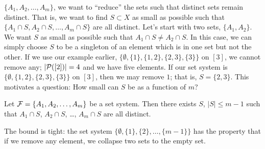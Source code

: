  $\{A_1,A_2,\dotsc,A_m\}$, we want to ``reduce'' the sets such that distinct sets remain distinct.
That is, we want to find $S\subset X$ as small as possible such that $\{A_1\cap S, A_2\cap S, \dotsc, A_m\cap S\}$ are all distinct. 
Let's start with two sets, $\{A_1,A_2\}$. We want $S$ as small as possible such that $A_1\cap S\neq A_2\cap S$. In this case, we can simply choose $S$ to be a singleton of an element which is in one set but not the other.
If we use our example earlier, $\{\emptyset, \{1\}, \{1,2\}, \{2,3\},\{3\}\}$ on $[3]$, we cannot remove any; $|\P([2])| = 4$ and we have five elements.
If our set system is $\{\emptyset, \{1,2\}, \{2,3\},\{3\}\}$ on $[3]$, then we may remove $1$; that is, $S = \{2,3\}$.
This motivates a question: How small can $S$ be as a function of $m$?
\begin{theorem}
Let $\F = \{A_1,A_2,\dotsc,A_m\}$ be a set system. Then there exists $S$, $|S|\leq m-1$ such that $A_1\cap S$, $A_2\cap S$, \ldots, $A_m\cap S$ are all distinct.
\end{theorem}
\begin{remark}
The bound is tight: the set system $\{\emptyset, \{1\}, \{2\}, \dotsc, \{m-1\}\}$ has the property that if we remove any element, we collapse two sets to the empty set.
\end{remark}
